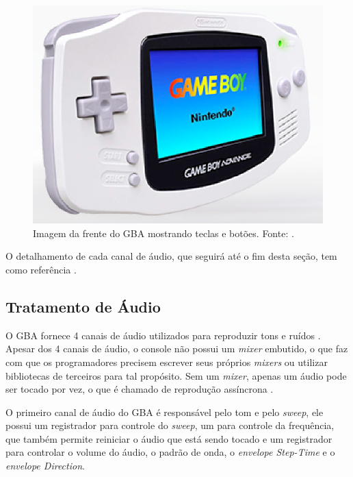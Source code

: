     \begin{figure}[H]
    \centering \includegraphics[keepaspectratio=true,scale=0.6]{figuras/gba-frente.eps}
      \caption[Imagem da frente do GBA mostrando teclas e botões]
        {Imagem da frente do GBA mostrando teclas e botões. Fonte: \cite{nintendo}.}
      \label{gba-frente}
    \end{figure}

  O detalhamento de cada canal de áudio, que seguirá até o fim desta seção, tem como referência \cite{gbatek}.

  \subsection{Tratamento de Áudio}

    O GBA fornece 4 canais de áudio utilizados para reproduzir tons e ruídos \cite{gbatek}. Apesar dos 4 canais de áudio, o console não possui um \textit{mixer} embutido, o que faz com que os programadores precisem escrever seus próprios \textit{mixers} ou utilizar bibliotecas de terceiros para tal propósito. Sem um \textit{mixer}, apenas um áudio pode ser tocado por vez, o que é chamado de reprodução assíncrona \cite{harbour}.

    O primeiro canal de áudio do GBA é responsável pelo tom e pelo \textit{sweep}, ele possui um registrador para controle do \textit{sweep}, um para controle da frequência, que também permite reiniciar o áudio que está sendo tocado e um registrador para controlar o volume do áudio, o padrão de onda, o \textit{envelope Step-Time} e o \textit{envelope Direction}.

